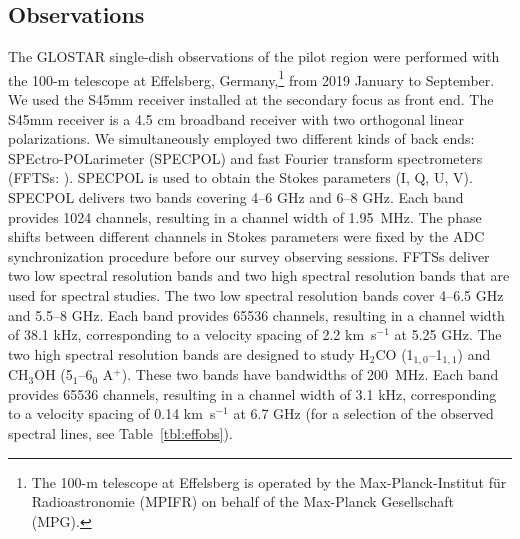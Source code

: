 \documentclass{aa}
\begin{document}
\subsection{Observations}
The GLOSTAR single-dish observations of the pilot region were performed with the 100-m telescope at Effelsberg, Germany,\footnote{The 100-m telescope at Effelsberg is operated by the Max-Planck-Institut f{\"u}r Radioastronomie (MPIFR) on behalf of the Max-Planck Gesellschaft (MPG).} from 2019 January to September. We used the S45mm receiver installed at the secondary focus as front end. The S45mm receiver is a 4.5 cm broadband receiver with two orthogonal linear polarizations. We simultaneously employed two different kinds of back ends:  SPEctro-POLarimeter (SPECPOL) and fast Fourier transform spectrometers (FFTSs: \citealp{Klein2012}). SPECPOL is used to obtain the Stokes parameters (I, Q, U, V). SPECPOL delivers two bands covering 4--6 GHz and 6--8 GHz. Each band provides 1024 channels, resulting in a channel width of 1.95~MHz. The phase shifts between different channels in Stokes parameters were fixed by the ADC synchronization procedure before our survey observing sessions. FFTSs deliver two low spectral resolution bands and two high spectral resolution bands that are used for spectral studies. The two low spectral resolution bands cover 4--6.5 GHz and 5.5--8 GHz. Each band provides 65536 channels, resulting in a channel width of 38.1 kHz, corresponding to a velocity spacing of 2.2 km~s$^{-1}$ at 5.25 GHz. The two high spectral resolution bands are designed to study H$_{2}$CO (1$_{1,0}$--1$_{1,1}$) and CH$_{3}$OH (5$_{1}$--6$_{0}$ A$^{+}$). These two bands have bandwidths of 200~MHz. Each band provides 65536 channels, resulting in a channel width of 3.1 kHz, corresponding to a velocity spacing of 0.14 km~s$^{-1}$ at 6.7 GHz (for a selection of the observed spectral lines, see Table~\ref{tbl:effobs}).
\end{document}
